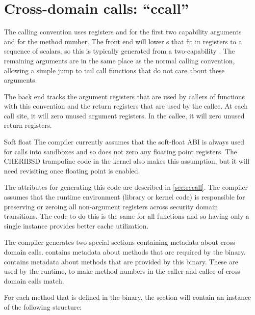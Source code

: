 \section{Cross-domain calls: ``ccall''}

The  calling convention uses registers  and  for the first two capability arguments and  for the method number.
The front end will lower s that fit in registers to a sequence of scalars, so this is typically generated from a two-capability .
The remaining arguments are in the same place as the normal calling convention, allowing a simple jump to tail call functions that do not care about these arguments.

The back end tracks the argument registers that are used by callers of functions with this convention and the return registers that are used by the callee.
At each call site, it will zero unused argument registers.
In the callee, it will zero unused return registers.

\begin{notebox}{Soft float}
	The compiler currently assumes that the soft-float ABI is always used for calls into sandboxes and so does not zero any floating point registers.
	The CHERIBSD trampoline code in the kernel also makes this assumption, but it will need revisiting once floating point is enabled.
\end{notebox}

The attributes for generating this code are described in \autoref{sec:cccall}.
The compiler assumes that the runtime environment (library or kernel code) is responsible for preserving or zeroing all non-argument registers across security domain transitions.
The code to do this is the same for all functions and so having only a single instance provides better cache utilization.

The compiler generates two special sections containing metadata about cross-domain calls.
 contains metadata about methods that are required by the binary.
 contains metadata about methods that are provided by this binary.
These are used by the  runtime, to make method numbers in the caller and callee of cross-domain calls match.

For each method that is defined in the binary, the  section will contain an instance of the following structure:

